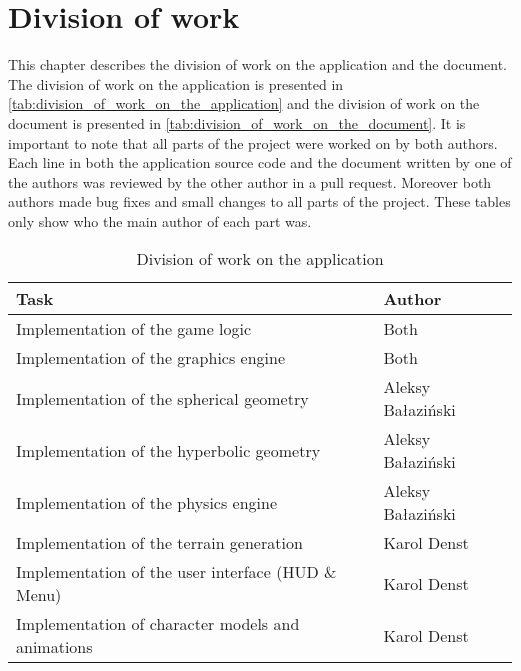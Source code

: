 \chapter{Division of work}\label{ch:division_of_work}
This chapter describes the division of work on the application and the document.
The division of work on the application is presented in \autoref{tab:division_of_work_on_the_application} and the division of work on the document is presented in \autoref{tab:division_of_work_on_the_document}.
It is important to note that all parts of the project were worked on by both authors.
Each line in both the application source code and the document written by one of the authors was reviewed by the other author in a pull request.
Moreover both authors made bug fixes and small changes to all parts of the project.
These tables only show who the main author of each part was.

\begin{table}[h]
    \centering
    \begin{tabular}{|l|l|}
    \hline
    Task     & Author        \\ \hline
    Implementation of the game logic & Both \\
    Implementation of the graphics engine & Both \\
    Implementation of the spherical geometry & Aleksy Bałaziński      \\
    Implementation of the hyperbolic geometry & Aleksy Bałaziński      \\
    Implementation of the physics engine & Aleksy Bałaziński      \\
    Implementation of the terrain generation & Karol Denst      \\
    Implementation of the user interface (HUD \& Menu) & Karol Denst      \\
    Implementation of character models and animations & Karol Denst      \\
    \hline
    \end{tabular}
    \caption{Division of work on the application}
    \label{tab:division_of_work_on_the_application}
\end{table}
    
